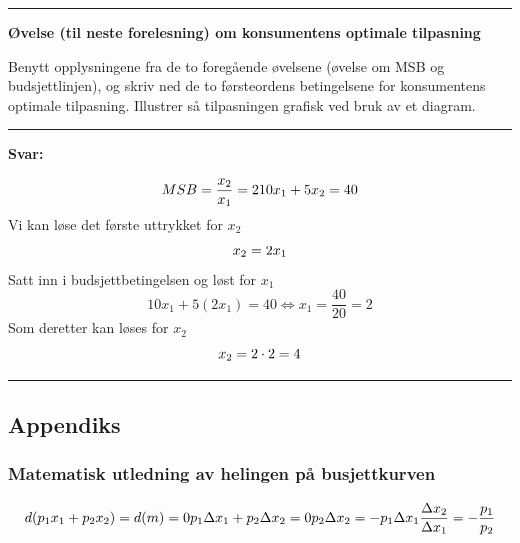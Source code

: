 \documentclass[
  letterpaper,
  DIV=11,
  numbers=noendperiod]{scrartcl}
\begin{document}
\begin{center}\rule{0.5\linewidth}{0.5pt}\end{center}

\textbf{Øvelse (til neste forelesning) om konsumentens optimale
tilpasning}

Benytt opplysningene fra de to foregående øvelsene (øvelse om MSB og
budsjettlinjen), og skriv ned de to førsteordens betingelsene for
konsumentens optimale tilpasning. Illustrer så tilpasningen grafisk ved
bruk av et diagram.

\begin{center}\rule{0.5\linewidth}{0.5pt}\end{center}

\textbf{Svar:}

\begin{equation*}
MSB=\frac{x_2}{x_1} = 2  \\
10x_{1}+5x_{2}=40
\end{equation*} Vi kan løse det første uttrykket for \(x_2\)
\begin{equation*}
x_2 = 2x_1  \\
\end{equation*} Satt inn i budsjettbetingelsen og løst for \(x_1\)
\begin{equation*}
10x_{1}+5(2x{_1})=40 \Leftrightarrow
x_{1}=\frac{40}{20}=2
\end{equation*} Som deretter kan løses for \(x_2\) \begin{equation*}
x_2 = 2\cdot 2= 4  \\
\end{equation*}

\begin{center}\rule{0.5\linewidth}{0.5pt}\end{center}

\subsection{Appendiks}\label{appendiks-1}

\subsubsection{Matematisk utledning av helingen på
busjettkurven}\label{matematisk-utledning-av-helingen-puxe5-busjettkurven}

\begin{equation}
d(p_{1}x_{1}+p_{2}x_{2})=d(m)=0 \\
p_{1}\Delta x_{1}+p_{2}\Delta x_{2}  = 0 \\ 
p_{2}\Delta x_{2} =-p_{1}\Delta x_{1} \\
\frac{\Delta x_{2}}{\Delta x_{1}}= - \frac{p_{1}}{p_{2}}  \\ 
\end{equation}
\end{document}
